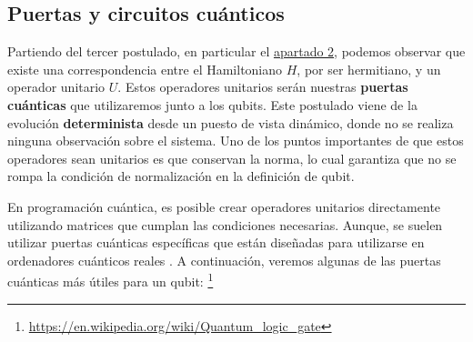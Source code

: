\subsection{Puertas y circuitos cuánticos}

 Partiendo del tercer postulado, en particular el \hyperref[Postulado3.2]{apartado 2}, podemos observar que existe una correspondencia entre el Hamiltoniano $H$, por ser hermitiano, y un operador unitario $U$. Estos operadores unitarios serán nuestras \textbf{puertas cuánticas} que utilizaremos junto a los qubits. Este postulado viene de la evolución \textbf{determinista} desde un puesto de vista dinámico, donde no se realiza ninguna observación sobre el sistema.  Uno de los puntos importantes de que estos operadores sean unitarios es que conservan la norma, lo cual garantiza que no se rompa la condición de normalización en la definición de qubit. \newline
 
 En programación cuántica, es posible crear operadores unitarios directamente utilizando matrices que cumplan las condiciones necesarias. Aunque, se suelen utilizar puertas cuánticas específicas que están diseñadas para utilizarse en ordenadores cuánticos reales \cite{Note:Martin}. A continuación, veremos algunas de las puertas cuánticas más útiles para un qubit: \cite{B:Nielsen:2002} \footnote{\url{https://en.wikipedia.org/wiki/Quantum_logic_gate}}

